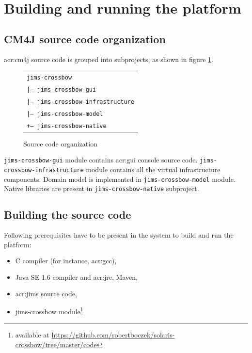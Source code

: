 \documentclass[11pt,openany]{book}
\begin{document}
    \section{Building and running the platform}
    \label{sec:impl:build}

      \subsection{CM4J source code organization}
      \label{sec:impl:structure}

        \gls{acr:cm4j} source code is grouped into subprojects, as shown in figure \ref{fig:impl:org}.

        \begin{figure}[H]
          \centering
          \begin{tabular}{l}
            \texttt{jims-crossbow}                    \\
            \texttt{|-- jims-crossbow-gui}            \\
            \texttt{|-- jims-crossbow-infrastructure} \\
            \texttt{|-- jims-crossbow-model}          \\
            \texttt{+-- jims-crossbow-native}
          \end{tabular}

          \caption{Source code organization}
          \label{fig:impl:org}
        \end{figure}

        \texttt{jims-crossbow-gui} module contains \gls{acr:gui} console source code.
        \texttt{jims-crossbow-infrastructure} module contains all the virtual infrastructure components. Domain model is
        implemented in \texttt{jims-crossbow-model} module. Native libraries are present in
        \texttt{jims-crossbow-native} subproject.


      \subsection{Building the source code}

        Following prerequisites have to be present in the system to build and run the platform:

        \begin{itemize}
          \item C compiler (for instance, \gls{acr:gcc}),
          \item Java SE 1.6 compiler and \gls{acr:jre}, Maven,
          \item \gls{acr:jims} source code,
          \item jims-crossbow module\footnote{available at
                \url{https://github.com/robertboczek/solaris-crossbow/tree/master/code}}
        \end{itemize}
\end{document}
